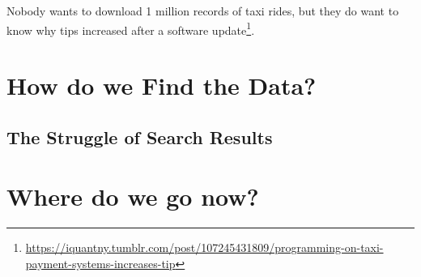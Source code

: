 \documentclass[
]{book}
\begin{document}
Nobody wants to download 1 million records of taxi rides, but they do want to know why tips increased after a software update\footnote{\url{https://iquantny.tumblr.com/post/107245431809/programming-on-taxi-payment-systems-increases-tip}}.

\hypertarget{how-do-we-find-data}{%
\chapter{How do we Find the Data?}\label{how-do-we-find-data}}

\hypertarget{the-struggle-of-search-results}{%
\section{The Struggle of Search Results}\label{the-struggle-of-search-results}}

\hypertarget{where-do-we-go-now}{%
\chapter{Where do we go now?}\label{where-do-we-go-now}}

  
\end{document}
